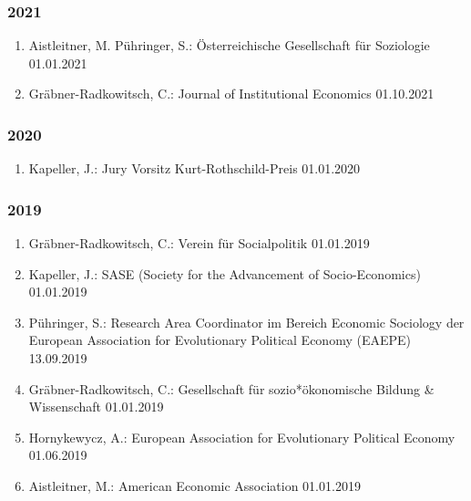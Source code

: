 \subsubsection*{2021}
\begin{enumerate}
	\item Aistleitner, M. Pühringer, S.: Österreichische Gesellschaft für Soziologie 01.01.2021
	\item Gräbner-Radkowitsch, C.: Journal of Institutional Economics 01.10.2021
\end{enumerate}
\subsubsection*{2020}
\begin{enumerate}
	\item Kapeller, J.: Jury Vorsitz Kurt-Rothschild-Preis 01.01.2020
\end{enumerate}
\subsubsection*{2019}
\begin{enumerate}
	\item Gräbner-Radkowitsch, C.: Verein für Socialpolitik 01.01.2019
	\item Kapeller, J.: SASE (Society for the Advancement of Socio-Economics) 01.01.2019
	\item Pühringer, S.: Research Area Coordinator im Bereich \glqq Economic Sociology\grqq{} der European Association for Evolutionary Political Economy (EAEPE) 13.09.2019
	\item Gräbner-Radkowitsch, C.: Gesellschaft für sozio*ökonomische Bildung \& Wissenschaft 01.01.2019
	\item Hornykewycz, A.: European Association for Evolutionary Political Economy 01.06.2019
	\item Aistleitner, M.: American Economic Association 01.01.2019
\end{enumerate}
